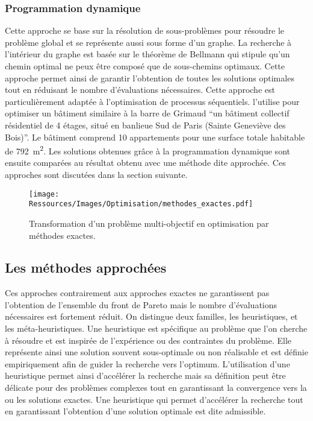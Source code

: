 \subsubsection{Programmation dynamique} %
\label{ssub:programmation_dynamique}
Cette approche se base sur la résolution de sous-problèmes pour résoudre le
problème global et se représente aussi sous forme d’un graphe. La recherche à
l’intérieur du graphe est basée sur le théorème de Bellmann qui stipule qu’un
chemin optimal ne peux être composé que de sous-chemins optimaux. Cette approche
permet ainsi de garantir l’obtention de toutes les solutions optimales tout en
réduisant le nombre d’évaluations nécessaires. Cette approche est
particulièrement adaptée à l’optimisation de processus séquentiels.
\textcite{Rivallain2013} l’utilise pour optimiser un bâtiment similaire à la
barre de Grimaud \enquote{un bâtiment collectif résidentiel de 4 étages, situé en banlieue Sud
de Paris (Sainte Geneviève des Bois)}. Le bâtiment comprend 10 appartements pour
une surface totale habitable de \SI{792}{\meter\squared}. Les solutions obtenues
grâce à la programmation dynamique sont ensuite comparées au résultat obtenu avec
une méthode dite approchée. Ces approches sont discutées dans la section suivante.

\begin{figure}
    \centering
    \texttt{[image: Ressources/Images/Optimisation/methodes\_exactes.pdf]}
    \caption{Transformation d’un problème multi-objectif en optimisation par méthodes
             exactes.}
    \label{fig:multi_exactes}
\end{figure}



\subsection{Les méthodes approchées} %
\label{sub:les_methodes_approchees}
Ces approches contrairement aux approches exactes ne garantissent pas
l’obtention de l’ensemble du front de Pareto mais le nombre d’évaluations
nécessaires est fortement réduit. On distingue deux familles, les heuristiques,
et les méta-heuristiques. Une heuristique est spécifique au problème que l’on
cherche à résoudre et est inspirée de l’expérience ou des contraintes du
problème. Elle représente ainsi une solution souvent sous-optimale ou non
réalisable et est définie empiriquement afin de guider la recherche vers
l’optimum. L’utilisation d’une heuristique permet ainsi d’accélérer la recherche
mais sa définition peut être délicate pour des problèmes complexes tout en
garantissant la convergence vers la ou les solutions exactes. Une heuristique
qui permet d’accélérer la recherche tout en garantissant l’obtention d’une
solution optimale est dite admissible.


